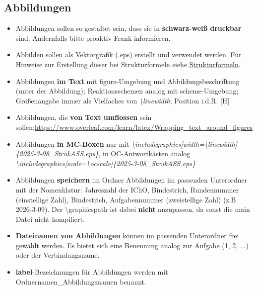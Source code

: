 \documentclass[../main.tex]{subfiles}
\begin{document}
\subsection{Abbildungen}
\begin{itemize}
    \item Abbildungen sollen so gestaltet sein, dass sie in \textbf{schwarz-wei\ss{} druckbar} sind. Andernfalls bitte proaktiv Frank informieren. 
    \item Abbilden sollen als Vektorgrafik (.eps) erstellt und verwendet werden. Für Hinweise zur Erstellung dieser bei Strukturformeln siehe \hyperlink{Strukturformeln_eps}{Strukturformeln}. 
    \item Abbildungen \textbf{im Text} mit figure-Umgebung und Abbildungsbeschriftung (unter der Abbildung); Reaktionsschemen analog mit scheme-Umgebung; Gr\"o\ss{}enangabe immer als Vielfaches von \textit{\hypertarget{linewidth}{\textbackslash linewidth}}; Position i.d.R. [H]
    \item Abbildungen, die \textbf{von Text umflossen} sein sollen:\newline \url{https://www.overleaf.com/learn/latex/Wrapping_text_around_figures}
    \item Abbildungen \textbf{in MC-Boxen} nur mit \textit{\hypertarget{includegraphics}{\textbackslash includegraphics[width=\textbackslash linewidth]\{2025-3-08\_StrukASS.eps\}}}, in OC-Antwortk\"asten analog \hypertarget{ocscale}{\textit{\textbackslash includegraphics[scale=\textbackslash ocscale]\{2025-3-08\_StrukASS.eps\}}}
    \item Abbildungen \textbf{speichern} im Ordner Abbildungen im passenden Unterordner mit der Nomenklatur: Jahreszahl der IChO, Bindestrich, Rundennummer (einstellige Zahl), Bindestrich, Aufgabennummer (zweistellige Zahl) (z.B. 2026-3-09). Der \textbackslash graphicspath ist dabei \textbf{nicht} anzupassen, da sonst die main Datei nicht kompiliert. 
    \item \textbf{Dateinamen von Abbildungen} können im passenden Unterordner frei gewählt werden. Es bietet sich eine Benennung analog zur Aufgabe (1, 2, ...) oder der Verbindungsname. 
    \item \textbf{label}-Bezeichnungen für Abbildungen werden mit Ordnernamen\_Abbildungsnamen benannt. 
\end{itemize}
\end{document}

